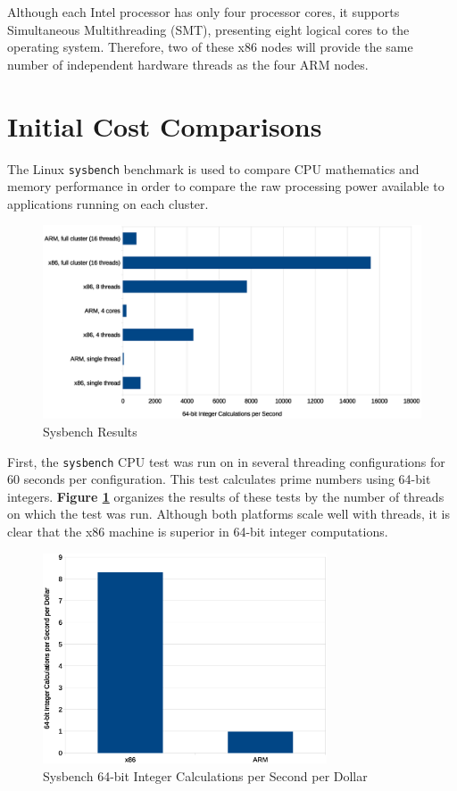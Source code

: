 \documentclass[11pt]{book}
\begin{document}
Although each Intel processor has only four processor cores, it supports
Simultaneous Multithreading (SMT), presenting eight logical cores to the
operating system. Therefore, two of these x86 nodes will provide the same number
of independent hardware threads as the four ARM nodes.

\section{\textbf{Initial Cost Comparisons}}

The Linux \verb;sysbench; benchmark is used to compare CPU mathematics and
memory performance in order to compare the raw processing power available to
applications running on each cluster.

\begin{figure}
\centering
\includegraphics[width=\textwidth]{sysbench_all}
\caption{Sysbench Results}
\label{sysbench-all}
\end{figure}

First, the \verb;sysbench; CPU test was
run on in several threading configurations for 60 seconds per
configuration. This test calculates prime numbers using 64-bit
integers. \textbf{Figure \ref{sysbench-all}} organizes the results of these
tests by the number of threads on which the test was run. Although both
platforms scale well with threads, it is clear that the x86 machine is superior
in 64-bit integer computations. 

\begin{figure}
\centering
\includegraphics[width=0.75\textwidth]{sysbench_cost}
\caption{Sysbench 64-bit Integer Calculations per Second per Dollar}
\label{sysbench-cost}
\end{figure}
\end{document}
